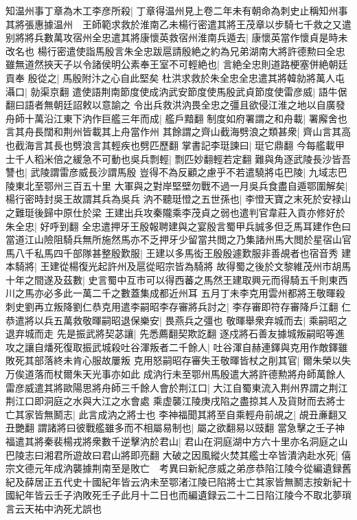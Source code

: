 知温州事丁章為木工李彦所殺|{
	丁章得温州見上卷二年未有朝命為刺史止稱知州事}
其將張惠據温州　王師範求救於淮南乙未楊行密遣其將王茂章以步騎七千救之又遣别將將兵數萬攻宿州全忠遣其將康懷英救宿州淮南兵遁去|{
	康懷英當作懷貞是時未改名也}
楊行密遣使詣馬殷言朱全忠跋扈請殷絶之約為兄弟湖南大將許德勲曰全忠雖無道然挾天子以令諸侯明公素奉王室不可輕絶也|{
	言絶全忠則道路梗塞併絶朝廷貢奉}
殷從之|{
	馬殷附汴之心自此堅矣}
杜洪求救於朱全忠全忠遣其將韓勍將萬人屯灄口|{
	勍渠京翻}
遣使語荆南節度使成汭武安節度使馬殷武貞節度使雷彦威|{
	語牛倨翻曰語者無朝廷詔敕以意諭之}
令出兵救洪汭畏全忠之彊且欲侵江淮之地以自廣發舟師十萬沿江東下汭作巨艦三年而成|{
	艦戶黯翻}
制度如府署謂之和舟載|{
	署廨舍也言其舟長闊和荆州皆載其上舟當作州}
其餘謂之齊山截海劈浪之類甚衆|{
	齊山言其高也截海言其長也劈浪言其輕疾也劈匹歷翻}
掌書記李珽諫曰|{
	珽它鼎翻}
今每艦載甲士千人稻米倍之緩急不可動也吳兵剽輕|{
	剽匹妙翻輕若定翻}
難與角逐武陵長沙皆吾讐也|{
	武陵謂雷彦威長沙謂馬殷}
豈得不為反顧之慮乎不若遣驍將屯巴陵|{
	九域志巴陵東北至鄂州三百五十里}
大軍與之對岸堅壁勿戰不過一月吳兵食盡自遁鄂圍解矣|{
	楊行密時封吳王故謂其兵為吳兵}
汭不聽珽憕之五世孫也|{
	李憕天寶之末死於安禄山之難珽後歸中原仕於梁}
王建出兵攻秦隴乘李茂貞之弱也遣判官韋莊入貢亦修好於朱全忠|{
	好呼到翻}
全忠遣押牙王殷報聘建與之宴殷言蜀甲兵誠多但乏馬耳建作色曰當道江山險阻騎兵無所施然馬亦不乏押牙少留當共閲之乃集諸州馬大閲於星宿山官馬八千私馬四千部隊甚整殷歎服|{
	王建以多馬衒王殷殷遽歎服非善覘者也宿音秀}
建本騎將|{
	王建從楊復光起許州及扈從昭宗皆為騎將}
故得蜀之後於文黎維茂州市胡馬十年之間遂及茲數|{
	史言蜀中互市可以得西蕃之馬然王建取興元而得騎五千則東西川之馬亦必多此一萬二千之數蓋集成都近州耳}
五月丁未李克用雲州都將王敬暉殺刺史劉再立叛降劉仁恭克用遣李嗣昭李存審將兵討之|{
	李存審即符存審降戶江翻}
仁恭遣將以兵五萬救敬暉嗣昭退保樂安|{
	畏燕兵之彊也}
敬暉舉衆弃城而去|{
	乘嗣昭之退弃城而走}
先是振武將契苾讓|{
	先悉薦翻契欺訖翻}
逐戍將石善友據城叛嗣昭等進攻之讓自燔死復取振武城殺吐谷渾叛者二千餘人|{
	吐谷渾自赫連鐸與克用作敵鐸雖敗死其部落終未肯心服故屢叛}
克用怒嗣昭存審失王敬暉皆杖之削其官|{
	爾朱榮以失万俟道落而杖爾朱天光事亦如此}
成汭行未至鄂州馬殷遣大將許德勲將舟師萬餘人雷彦威遣其將歐陽思將舟師三千餘人會於荆江口|{
	大江自蜀東流入荆州界謂之荆江荆江口即洞庭之水與大江之水會處}
乘虚襲江陵庚戌陷之盡掠其人及貨財而去將士亡其家皆無鬭志|{
	此言成汭之將士也}
李神福聞其將至自乘輕舟前覘之|{
	覘丑亷翻又丑艷翻}
謂諸將曰彼戰艦雖多而不相屬易制也|{
	屬之欲翻易以豉翻}
當急擊之壬子神福遣其將秦裴楊戎將衆數千逆擊汭於君山|{
	君山在洞庭湖中方六十里亦名洞庭之山巴陵志曰湘君所遊故曰君山將即亮翻}
大破之因風縱火焚其艦士卒皆潰汭赴水死|{
	僖宗文德元年成汭襲據荆南至是敗亡　考異曰新紀彦威之弟彦恭陷江陵今從編遺録舊紀及薛居正五代史十國紀年皆云汭未至鄂渚江陵已陷將士亡其家皆無鬭志按新紀十國紀年皆云壬子汭敗死壬子此月十二日也而編遺録云二十二日陷江陵今不取北夢瑣言云天祐中汭死尤誤也}

